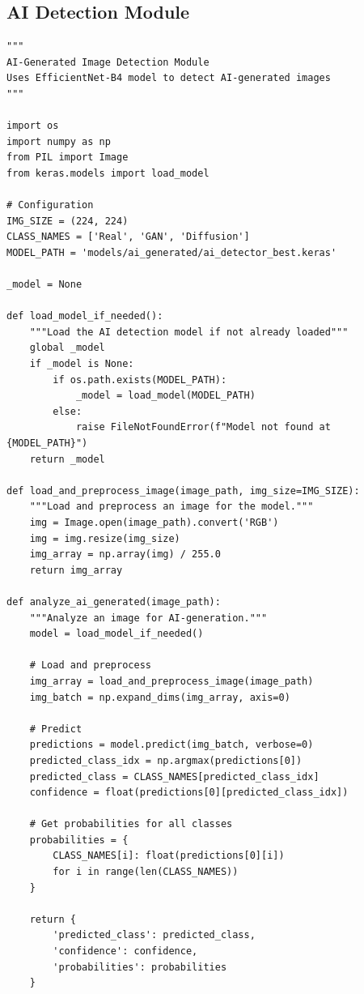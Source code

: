 \documentclass[12pt,a4paper]{article}
\begin{document}
\subsection{AI Detection Module}
\begin{lstlisting}[caption=Complete AI Detection Implementation]
"""
AI-Generated Image Detection Module
Uses EfficientNet-B4 model to detect AI-generated images
"""

import os
import numpy as np
from PIL import Image
from keras.models import load_model

# Configuration
IMG_SIZE = (224, 224)
CLASS_NAMES = ['Real', 'GAN', 'Diffusion']
MODEL_PATH = 'models/ai_generated/ai_detector_best.keras'

_model = None

def load_model_if_needed():
    """Load the AI detection model if not already loaded"""
    global _model
    if _model is None:
        if os.path.exists(MODEL_PATH):
            _model = load_model(MODEL_PATH)
        else:
            raise FileNotFoundError(f"Model not found at {MODEL_PATH}")
    return _model

def load_and_preprocess_image(image_path, img_size=IMG_SIZE):
    """Load and preprocess an image for the model."""
    img = Image.open(image_path).convert('RGB')
    img = img.resize(img_size)
    img_array = np.array(img) / 255.0
    return img_array

def analyze_ai_generated(image_path):
    """Analyze an image for AI-generation."""
    model = load_model_if_needed()
    
    # Load and preprocess
    img_array = load_and_preprocess_image(image_path)
    img_batch = np.expand_dims(img_array, axis=0)
    
    # Predict
    predictions = model.predict(img_batch, verbose=0)
    predicted_class_idx = np.argmax(predictions[0])
    predicted_class = CLASS_NAMES[predicted_class_idx]
    confidence = float(predictions[0][predicted_class_idx])
    
    # Get probabilities for all classes
    probabilities = {
        CLASS_NAMES[i]: float(predictions[0][i]) 
        for i in range(len(CLASS_NAMES))
    }
    
    return {
        'predicted_class': predicted_class,
        'confidence': confidence,
        'probabilities': probabilities
    }
\end{lstlisting}
\end{document}
